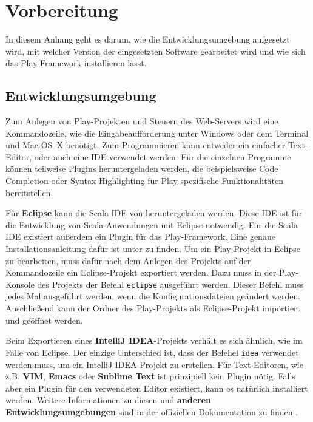 
\chapter{Vorbereitung} %
\label{cha:anhang_vorbereitung}

In diesem Anhang geht es darum, wie die Entwicklungsumgebung aufgesetzt wird, mit welcher Version der eingesetzten Software gearbeitet wird und wie sich das Play-Framework installieren lässt.

\section{Entwicklungsumgebung} %
\label{sec:entwicklungsumgebung}

Zum Anlegen von Play-Projekten und Steuern des Web-Servers wird eine Kommandozeile, wie die Eingabeaufforderung unter Windows oder dem Terminal und Mac OS~X benötigt.
Zum Programmieren kann entweder ein einfacher Text-Editor, oder auch eine IDE verwendet werden.
Für die einzelnen Programme können teilweise Plugins heruntergeladen werden, die beispielsweise Code Completion oder Syntax Highlighting für Play-spezifische Funktionalitäten bereitstellen.

Für \textbf{Eclipse} kann die Scala IDE von \citealt{scala_ide} heruntergeladen werden.
Diese IDE ist für die Entwicklung von Scala-Anwendungen mit Eclipse notwendig.
Für die Scala IDE existiert außerdem ein Plugin für das Play-Framework.
Eine genaue Installationsanleitung dafür ist unter \citealt{scala_ide_play_plugin} zu finden.
Um ein Play-Projekt in Eclipse zu bearbeiten, muss dafür nach dem Anlegen des Projekts auf der Kommandozeile ein Eclipse-Projekt exportiert werden.
Dazu muss in der Play-Konsole des Projekts der Befehl \lstinline|eclipse| ausgeführt werden.
Dieser Befehl muss jedes Mal ausgeführt werden, wenn die Konfigurationsdateien geändert werden.
Anschließend kann der Ordner des Play-Projekts als Eclipse-Projekt importiert und geöffnet werden.

Beim Exportieren eines \textbf{IntelliJ IDEA}-Projekts verhält es sich ähnlich, wie im Falle von Eclipse.
Der einzige Unterschied ist, dass der Befehel \lstinline|idea| verwendet werden muss, um ein IntelliJ IDEA-Projekt zu erstellen.
Für Text-Editoren, wie z.B. \textbf{VIM}, \textbf{Emacs} oder \textbf{Sublime Text} ist prinzipiell kein Plugin nötig.
Falls aber ein Plugin für den verwendeten Editor existiert, kann es natürlich installiert werden.
Weitere Informationen zu diesen und \textbf{anderen Entwicklungsumgebungen} sind in der offiziellen Dokumentation zu finden \cite[vgl.][]{ide}.

